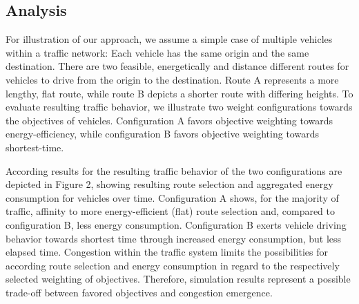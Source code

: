 \documentclass[conference]{../cls/IEEEtran}
\begin{document}
\subsection{Analysis}

For illustration of our approach, we assume a simple case of multiple vehicles
within a traffic network: Each vehicle has the same origin and the same
destination. There are two feasible, energetically and distance different
routes for vehicles to drive from the origin to the destination. Route A
represents a more lengthy, flat route, while route B depicts a shorter route
with differing heights. To evaluate resulting traffic behavior, we
illustrate two weight configurations towards the objectives of vehicles.
Configuration A favors objective weighting towards energy-efficiency, while
configuration B favors objective weighting towards shortest-time.

According results for the resulting traffic behavior of the two configurations
are depicted in Figure 2, showing resulting route selection and aggregated
energy consumption for vehicles over time. Configuration A shows, for the
majority of traffic, affinity to more energy-efficient (flat) route selection
and, compared to configuration B, less energy consumption. Configuration B
exerts vehicle driving behavior towards shortest time through increased energy
consumption, but less elapsed time. Congestion within the
traffic system limits the possibilities for according route selection and
energy consumption in regard to the respectively selected weighting of
objectives. Therefore, simulation results represent a
possible trade-off between favored objectives and congestion emergence.
\end{document}
